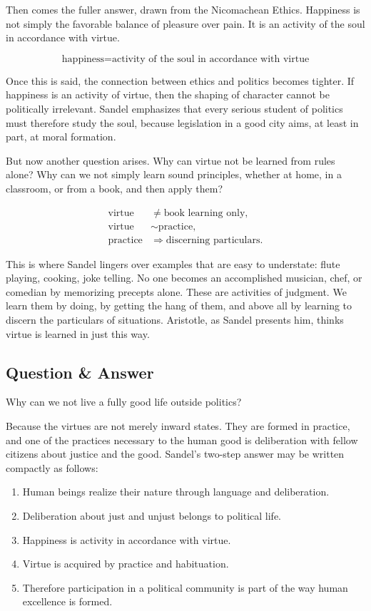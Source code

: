 Then comes the fuller answer, drawn from the Nicomachean Ethics. Happiness is not simply the favorable balance of pleasure over pain. It is an activity of the soul in accordance with virtue.

\begin{equation}
\text{happiness}
=
\text{activity of the soul in accordance with virtue}
\end{equation}

Once this is said, the connection between ethics and politics becomes tighter. If happiness is an activity of virtue, then the shaping of character cannot be politically irrelevant. Sandel emphasizes that every serious student of politics must therefore study the soul, because legislation in a good city aims, at least in part, at moral formation.

But now another question arises. Why can virtue not be learned from rules alone? Why can we not simply learn sound principles, whether at home, in a classroom, or from a book, and then apply them?

\begin{align}
\text{virtue} &\neq \text{book learning only},\\
\text{virtue} &\sim \text{practice},\\
\text{practice} &\Longrightarrow \text{discerning particulars}.
\end{align}

This is where Sandel lingers over examples that are easy to understate: flute playing, cooking, joke telling. No one becomes an accomplished musician, chef, or comedian by memorizing precepts alone. These are activities of judgment. We learn them by doing, by getting the hang of them, and above all by learning to discern the particulars of situations. Aristotle, as Sandel presents him, thinks virtue is learned in just this way.

\subsection{Question \& Answer}

Why can we not live a fully good life outside politics?

Because the virtues are not merely inward states. They are formed in practice, and one of the practices necessary to the human good is deliberation with fellow citizens about justice and the good. Sandel's two-step answer may be written compactly as follows:

\begin{enumerate}
\item Human beings realize their nature through language and deliberation.
\item Deliberation about just and unjust belongs to political life.
\item Happiness is activity in accordance with virtue.
\item Virtue is acquired by practice and habituation.
\item Therefore participation in a political community is part of the way human excellence is formed.
\end{enumerate}

